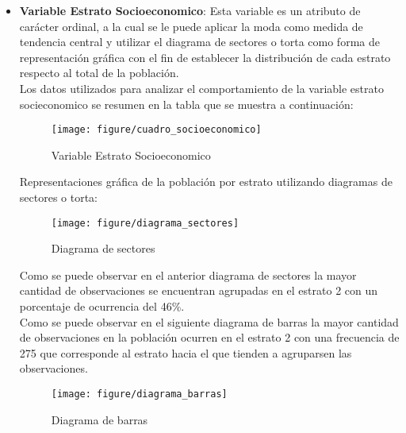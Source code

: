   \begin{itemize}
	\item \textbf {Variable Estrato Socioeconomico}: Esta variable es un atributo de carácter ordinal, a la cual se le puede aplicar la moda como medida de tendencia central y utilizar el diagrama de sectores o torta como forma de representación gráfica con el fin de establecer la distribución de cada estrato respecto al total de la población.  \\
	
	Los datos utilizados para analizar el comportamiento de la variable estrato socieconomico se resumen en la tabla que se muestra a continuación:
	 \bigskip
	\begin{figure} [ht]
		\centering
		\texttt{[image: figure/cuadro\_socioeconomico]}
		\caption{Variable Estrato Socioeconomico}
		\label{fig:cuadro_socioeconomico}
	\end{figure}

	Representaciones gráfica de la población por estrato utilizando diagramas de sectores o torta:  

	\begin{figure} [ht]
		\centering
		\texttt{[image: figure/diagrama\_sectores]}
		\caption{Diagrama de sectores}
		\label{fig:diagrama_sectores}
	\end{figure}

	Como se puede observar en el anterior diagrama de sectores la mayor cantidad de observaciones se encuentran agrupadas en el estrato 2 con un porcentaje de ocurrencia del 46\%.\\
	   
	Como se puede observar en el siguiente diagrama de barras la mayor cantidad de observaciones en la población ocurren en el estrato 2 con una frecuencia de 275 que corresponde al estrato hacia el que tienden a agruparsen las observaciones.
   \bigskip
	\begin{figure}[ht]
		\centering
		\texttt{[image: figure/diagrama\_barras]}
		\caption{Diagrama de barras}
		\label{fig:diagrama_barras}
	\end{figure}


\end{itemize}
